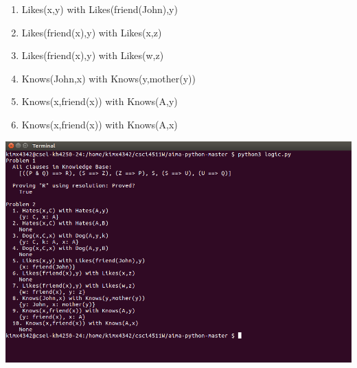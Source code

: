 \documentclass[10pt]{article}
\begin{document}
\begin{enumerate}
\begin{enumerate}
\begin{enumerate}
                    \item Likes(x,y) with Likes(friend(John),y)
                    \item Likes(friend(x),y) with Likes(x,z)
                    \item Likes(friend(x),y) with Likes(w,z)
                    \item Knows(John,x) with Knows(y,mother(y))
                    \item Knows(x,friend(x)) with Knows(A,y)
                    \item Knows(x,friend(x)) with Knows(A,x)
            	\end{enumerate}
    	\end{enumerate}
        \includegraphics[width=\textwidth]{hw4_1.png}
\end{enumerate}
\end{document}
